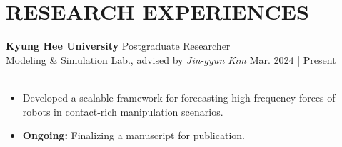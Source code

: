 \documentclass[a4paper,10pt]{extarticle}
\begin{document}
\section*{RESEARCH EXPERIENCES}
\noindent\textbf{Kyung Hee University} \hfill Postgraduate Researcher\\
Modeling \& Simulation Lab., advised by \textsl{Jin-gyun Kim} \hfill Mar. 2024 | Present\\
\vspace*{-0.25cm}\\
\begin{minipage}{0.77\textwidth}
	\small
	\begin{itemize}
		\item Developed a scalable framework for forecasting high-frequency forces of robots in contact-rich manipulation scenarios.
		\item \textbf{Ongoing:} Finalizing a manuscript for publication.
	\end{itemize}
\end{minipage}\\

\end{document}
